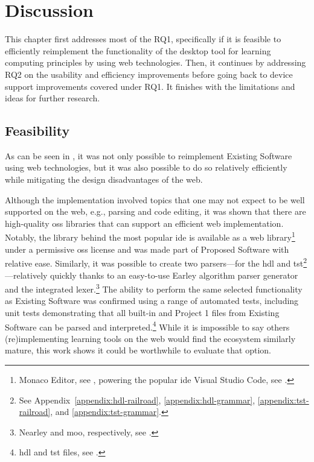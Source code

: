 \chapter{Discussion}
\label{Discussion}

This chapter first addresses most of the RQ1, specifically if it is feasible to efficiently reimplement the functionality of the desktop tool for learning computing principles by using web technologies.
Then, it continues by addressing RQ2 on the usability and efficiency improvements before going back to device support improvements covered under RQ1.
It finishes with the limitations and ideas for further research.

\section{Feasibility}

As can be seen in , it was not only possible to reimplement Existing Software using web technologies, but it was also possible to do so relatively efficiently while mitigating the design disadvantages of the web.

Although the implementation involved topics that one may not expect to be well supported on the web, e.g., parsing and code editing, it was shown that there are high-quality \gls{oss} libraries that can support an efficient web implementation.
Notably, the library behind the most popular \gls{ide} is available as a web library\footnote{Monaco Editor, see , powering the popular \gls{ide} Visual Studio Code, see .} under a permissive \gls{oss} license and was made part of Proposed Software with relative ease.
Similarly, it was possible to create two parsers---for the \gls{hdl} and \gls{tst}\footnote{See Appendix~\ref{appendix:hdl-railroad}, \ref{appendix:hdl-grammar}, \ref{appendix:tst-railroad}, and \ref{appendix:tst-grammar}.}---relatively quickly thanks to an easy-to-use Earley algorithm parser generator and the integrated lexer.\footnote{Nearley and moo, respectively, see .}
The ability to perform the same selected functionality as Existing Software was confirmed using a range of automated tests, including unit tests demonstrating that all built-in and Project 1 files from Existing Software can be parsed and interpreted.\footnote{\gls{hdl} and \gls{tst} files, see .}
While it is impossible to say others (re)implementing learning tools on the web would find the ecosystem similarly mature, this work shows it could be worthwhile to evaluate that option.

